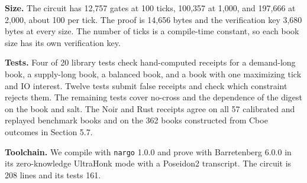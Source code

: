 \textbf{Size.} The circuit has 12,757 gates at 100 ticks, 100,357 at 1,000, and 197,666 at 2,000, about 100 per tick. The proof is 14,656 bytes and the verification key 3,680 bytes at every size. The number of ticks is a compile-time constant, so each book size has its own verification key.

\textbf{Tests.} Four of 20 library tests check hand-computed receipts for a demand-long book, a supply-long book, a balanced book, and a book with one maximizing tick and IO interest. Twelve tests submit false receipts and check which constraint rejects them. The remaining tests cover no-cross and the dependence of the digest on the book and salt. The Noir and Rust receipts agree on all 57 calibrated and replayed benchmark books and on the 362 books constructed from Cboe outcomes in Section 5.7.

\textbf{Toolchain.} We compile with \texttt{nargo} 1.0.0 and prove with Barretenberg 6.0.0 in its zero-knowledge UltraHonk mode with a Poseidon2 transcript. The circuit is 208 lines and its tests 161.
